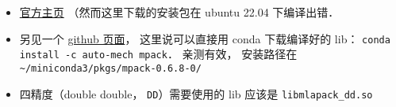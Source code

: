 
\begin{issues}
\issueDraft
\end{issues}

\begin{itemize}
\item \href{https://mplapack.sourceforge.net/}{官方主页} （然而这里下载的安装包在 ubuntu 22.04 下编译出错．
\item 另见一个 \href{https://github.com/Auto-Mech/MPACK}{github 页面}， 这里说可以直接用 conda 下载编译好的 lib： \verb|conda install -c auto-mech mpack|． 亲测有效， 安装路径在 \verb|~/miniconda3/pkgs/mpack-0.6.8-0/|
\item 四精度（double double， \verb|DD|）需要使用的 lib 应该是 \verb|libmlapack_dd.so|
\end{itemize}
